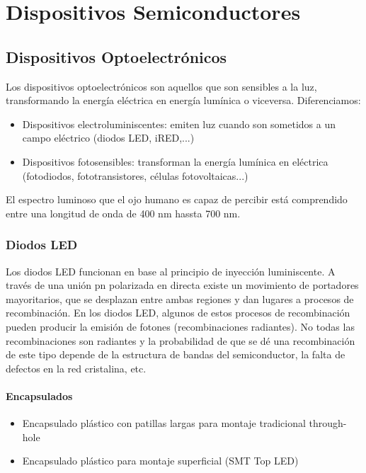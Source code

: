 \chapter{Dispositivos Semiconductores}

\section{Dispositivos Optoelectrónicos}

Los dispositivos optoelectrónicos son aquellos que son sensibles a la luz, transformando la energía eléctrica en energía lumínica o viceversa. Diferenciamos:

\begin{itemize}
    \item Dispositivos electroluminiscentes: emiten luz cuando son sometidos a un campo eléctrico (diodos LED, iRED,...)
    \item Dispositivos fotosensibles: transforman la energía lumínica en eléctrica (fotodiodos, fototransistores, células fotovoltaicas...)
\end{itemize}

El espectro luminoso que el ojo humano es capaz de percibir está comprendido entre una longitud de onda de 400 nm hassta 700 nm.

\subsection{Diodos LED}

Los diodos LED funcionan en base al principio de inyección luminiscente. A través de una unión pn polarizada en directa existe un movimiento de portadores mayoritarios, que se desplazan entre ambas regiones y dan lugares a procesos de recombinación. En los diodos LED, algunos de estos procesos de recombinación pueden producir la emisión de fotones (recombinaciones radiantes). No todas las recombinaciones son radiantes y la probabilidad de que se dé una recombinación de este tipo depende de la estructura de bandas del semiconductor, la falta de defectos en la red cristalina, etc.

\subsubsection{Encapsulados}
\begin{itemize}
    \item Encapsulado plástico con patillas largas para montaje tradicional through-hole
    \item Encapsulado plástico para montaje superficial (SMT Top LED)
\end{itemize}

